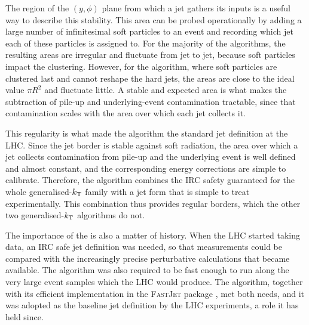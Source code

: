 The region of the $(y,\phi)$ plane from which a jet gathers its inputs is a useful
way to describe this stability. This area can be probed operationally by adding a 
large number of infinitesimal soft particles to an event and recording which jet each of these
particles is assigned to. For the majority of the algorithms, the resulting areas are irregular 
and fluctuate from jet to jet, because soft particles impact the clustering. However,
for the \antikt{} algorithm, where soft particles are clustered last and cannot reshape the hard jets, the
areas are close to the ideal value $\pi R^2$ and fluctuate little. A stable and expected
area is what makes the subtraction of pile-up and underlying-event contamination
tractable, since that contamination scales with the area over which each jet
collects it.

This regularity is what made the \antikt{} algorithm the standard jet
definition at the LHC. Since the jet border is stable against soft radiation,
the area over which a jet collects contamination from pile-up and the underlying
event is well defined and almost constant, and the corresponding energy
corrections are simple to calibrate. Therefore, the \antikt{} algorithm combines
the IRC safety guaranteed for the whole generalised-$k_{\mathrm{T}}$ family with a jet
form that is simple to treat experimentally. This combination thus provides
regular borders, which the other two generalised-$k_{\mathrm{T}}$ algorithms do not.

The importance of the \antikt{} is also a matter of history. When the LHC
started taking data, an IRC safe jet definition was needed, so that measurements
could be compared with the increasingly precise perturbative calculations
that became available. The algorithm was also required to be fast enough to run
along the very large event samples which the LHC would produce. The \antikt{} algorithm,
together with its efficient implementation in the \textsc{FastJet}
package \cite{Cacciari_2012}, met both needs, and it was adopted as the baseline jet
definition by the LHC experiments, a role it has held since.

